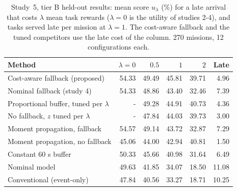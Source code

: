\begin{table}[t]
\caption{Study~5, tier B held-out results: mean score $u_\lambda$ (\%) for a late arrival that costs $\lambda$ mean task rewards ($\lambda = 0$ is the utility of studies 2-4), and tasks served late per mission at $\lambda = 1$. The cost-aware fallback and the tuned competitors use the late cost of the column. 270 missions, 12 configurations each.}\label{tab:s5}
\centering\small
\begin{tabular}{lrrrrr}
\toprule
Method & $\lambda = 0$ & $0.5$ & $1$ & $2$ & Late \\
\midrule
Cost-aware fallback (proposed) & 54.33 & 49.49 & 45.81 & 39.71 & 4.96 \\
Nominal fallback (study 4) & 54.33 & 48.86 & 43.40 & 32.46 & 7.39 \\
Proportional buffer, tuned per $\lambda$ & - & 49.28 & 44.91 & 40.73 & 4.36 \\
No fallback, $z$ tuned per $\lambda$ & - & 47.84 & 44.03 & 39.73 & 3.00 \\
Moment propagation, fallback & 54.57 & 49.14 & 43.72 & 32.87 & 7.29 \\
Moment propagation, no fallback & 45.06 & 44.00 & 42.94 & 40.81 & 1.50 \\
Constant 60 s buffer & 50.33 & 45.66 & 40.98 & 31.64 & 6.49 \\
Nominal model & 49.63 & 41.85 & 34.07 & 18.50 & 11.08 \\
Conventional (event-only) & 47.84 & 40.56 & 33.27 & 18.71 & 10.25 \\
\bottomrule
\end{tabular}
\end{table}
